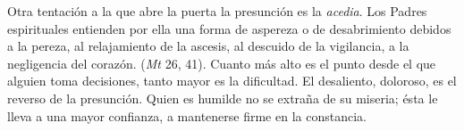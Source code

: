 \begin{ccebody}
	 Otra tentación a la que abre la puerta la presunción es la \emph{acedia}. Los Padres espirituales entienden por ella una forma de aspereza o de desabrimiento debidos a la pereza, al relajamiento de la ascesis, al descuido de la vigilancia, a la negligencia del corazón.  (\emph{Mt} 26, 41). Cuanto más alto es el punto desde el que alguien toma decisiones, tanto mayor es la dificultad. El desaliento, doloroso, es el reverso de la presunción. Quien es humilde no se extraña de su miseria; ésta le lleva a una mayor confianza, a mantenerse firme en la constancia.
\end{ccebody}